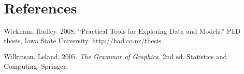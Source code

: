 \section*{References}

Wickham, Hadley. 2008. ``Practical Tools for Exploring Data and
Models.'' PhD thesis, Iowa State University.
\url{http://had.co.nz/thesis}.

Wilkinson, Leland. 2005. \emph{The Grammar of Graphics}. 2nd ed.
Statistics and Computing. Springer.
